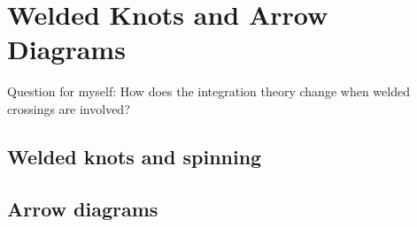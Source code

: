 \chapter{Welded Knots and Arrow Diagrams}
\label{ch:welded-knots-as-arrow-diagrams}


Question for myself: How does the integration theory change when welded crossings are involved?

\section{Welded knots and spinning}

\section{Arrow diagrams}
